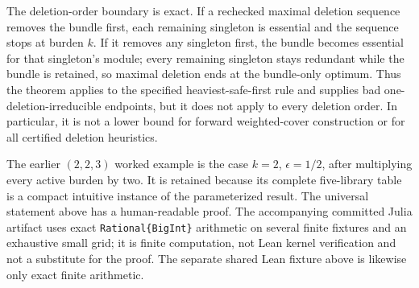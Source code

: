 The deletion-order boundary is exact.  If a rechecked maximal deletion
sequence removes the bundle first, each remaining singleton is essential and
the sequence stops at burden \(k\).  If it removes any singleton first, the
bundle becomes essential for that singleton's module; every remaining
singleton stays redundant while the bundle is retained, so maximal deletion
ends at the bundle-only optimum.  Thus the theorem applies to the specified
heaviest-safe-first rule and supplies bad one-deletion-irreducible endpoints,
but it does not apply to every deletion order.  In particular, it is not a
lower bound for forward weighted-cover construction or for all certified
deletion heuristics.

The earlier \((2,2,3)\) worked example is the case \(k=2\),
\(\epsilon=1/2\), after multiplying every active burden by two.  It is
retained because its complete five-library table is a compact intuitive
instance of the parameterized result.  The universal statement above has a
human-readable proof.  The accompanying committed Julia artifact uses exact
\texttt{Rational\{BigInt\}} arithmetic on several finite fixtures and an
exhaustive small grid; it is finite computation, not Lean kernel verification
and not a substitute for the proof.  The separate shared Lean fixture above is
likewise only exact finite arithmetic.
